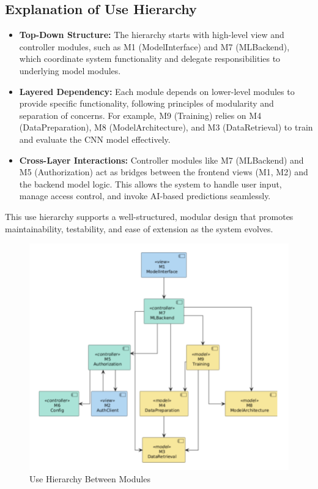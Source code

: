 \documentclass[12pt, titlepage]{article}
\begin{document}
\subsection{Explanation of Use Hierarchy}
\begin{itemize}
    \item \textbf{Top-Down Structure:} The hierarchy starts with high-level view and controller modules, such as M1 (ModelInterface) and M7 (MLBackend), which coordinate system functionality and delegate responsibilities to underlying model modules.
    \item \textbf{Layered Dependency:} Each module depends on lower-level modules to provide specific functionality, following principles of modularity and separation of concerns. For example, M9 (Training) relies on M4 (DataPreparation), M8 (ModelArchitecture), and M3 (DataRetrieval) to train and evaluate the CNN model effectively.
    \item \textbf{Cross-Layer Interactions:} Controller modules like M7 (MLBackend) and M5 (Authorization) act as bridges between the frontend views (M1, M2) and the backend model logic. This allows the system to handle user input, manage access control, and invoke AI-based predictions seamlessly.
\end{itemize}



This use hierarchy supports a well-structured, modular design that promotes maintainability, testability, and ease of extension as the system evolves.

\begin{figure}[h!]
\centering
\includegraphics[width=\textwidth]{use_hierachy.png}
\caption{Use Hierarchy Between Modules}
\end{figure}
\end{document}

